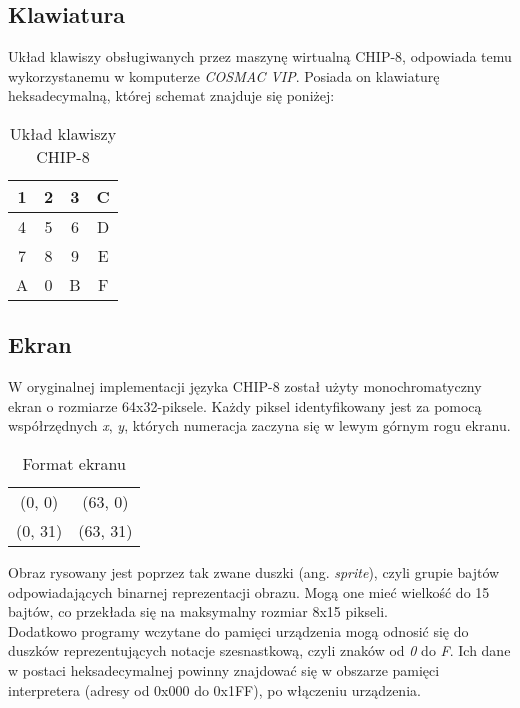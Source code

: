 \subsection{Klawiatura}
Układ klawiszy obsługiwanych przez maszynę wirtualną CHIP-8, odpowiada temu wykorzystanemu w komputerze \textit{COSMAC VIP}. Posiada on klawiaturę heksadecymalną, której schemat znajduje się poniżej:
\begin{table}[h!]
 \centering
 \caption{Układ klawiszy CHIP-8}
 \label{C8Keyboard}
 \begin{tabular}{|c|c|c|c|}
   \hline 
   1 & 2 & 3 & C\\
   \hline
   4 & 5 & 6 & D\\
   \hline
   7 & 8 & 9 & E\\
   \hline
   A & 0 & B & F\\
   \hline
 \end{tabular} 
\end{table}
\newpage
\subsection{Ekran}
 W oryginalnej implementacji języka CHIP-8 został użyty monochromatyczny ekran o rozmiarze 64x32-piksele. Każdy piksel identyfikowany jest za pomocą współrzędnych \textit{x}, \textit{y}, których numeracja zaczyna się w lewym górnym rogu ekranu. 

\begin{table}[h!]
  \centering
  \caption{Format ekranu}
  \label{C8Display}
  \begin{tabular}{|c c|}
    \hline 
    (0, 0) & (63, 0)\\ [1ex] 
    (0, 31) & (63, 31)\\ 
    \hline
  \end{tabular} 
\end{table}

Obraz rysowany jest poprzez tak zwane duszki (ang. \textit{sprite}), czyli grupie bajtów odpowiadających binarnej reprezentacji obrazu. Mogą one mieć wielkość do 15 bajtów, co przekłada się na maksymalny rozmiar 8x15 pikseli.\\

Dodatkowo programy wczytane do pamięci urządzenia mogą odnosić się do duszków reprezentujących notacje szesnastkową, czyli znaków od \textit{0} do \textit{F}. Ich dane w postaci heksadecymalnej powinny znajdować się w obszarze pamięci interpretera (adresy od 0x000 do 0x1FF), po włączeniu urządzenia.



